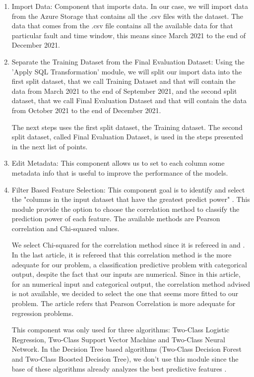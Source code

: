 \begin{enumerate}
    \item{Import Data:}
Component that imports data. In our case, we will import data from the Azure Storage that contains all the .csv files with the dataset. The data that comes from the .csv file contains all the available data for that particular fault and time window, this means since March 2021 to the end of December 2021.

    \item{Separate the Training Dataset from the Final Evaluation Dataset:}
Using the 'Apply SQL Transformation' module, we will split our import data into the first split dataset, that we call Training Dataset and that will contain the data from March 2021 to the end of September 2021, and the second split dataset, that we call Final Evaluation Dataset and that will contain the data from October 2021 to the end of December 2021.

The next steps uses the first split dataset, the Training dataset. The second split dataset, called Final Evaluation Dataset, is used in the steps presented in the next list of points.
    
    \item{Edit Metadata:}
This component allows us to set to each column some metadata info that is useful to improve the performance of the models.
    
    \item{Filter Based Feature Selection:}
This component goal is to identify and select the "columns in the input dataset that have the greatest predict power" \cite{AZURE_MACHINE_LEARNING}. This module provide the option to choose the correlation method to classify the prediction power of each feature. The available methods are Pearson correlation and Chi-squared values.

We select Chi-squared for the correlation method since it is refereed in \cite{OLD_41_WIND} and \cite{MLMistery_Feature_Selection}. In the last article, it is refereed that this correlation method is the more adequate for our problem, a classification predictive problem with categorical output, despite the fact that our inputs are numerical. Since in this article, for an numerical input and categorical output, the correlation method advised is not available, we decided to select the one that seems more fitted to our problem. The article refers that Pearson Correlation is more adequate for regression problems.

This component was only used for three algorithms: Two-Class Logistic Regression, Two-Class Support Vector Machine and Two-Class Neural Network. In the Decision Tree based algorithms (Two-Class Decision Forest and Two-Class Boosted Decision Tree), we don't use this module since the base of these algorithms already analyzes the best predictive features \cite{TDC_Feature_Selection}.


\end{enumerate}
